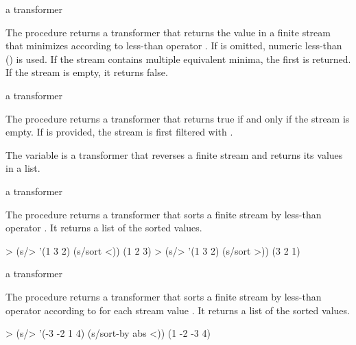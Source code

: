 \begin{procedure}
\end{procedure}
\returns{} a transformer

The  procedure returns a transformer that returns the value  in a
finite stream that minimizes  according to less-than
operator . If  is omitted, numeric less-than (\code{<}) is used. If the
stream contains multiple equivalent minima, the first is returned. If the stream is empty,
it returns false.

\begin{procedure}
\end{procedure}
\returns{} a transformer

The  procedure returns a transformer that returns true if and only if
the stream is empty. If  is provided, the stream is first filtered
with .

\begin{variable}
\end{variable}
\antipar

The  variable is a transformer that reverses a finite stream and returns
its values in a list.

\begin{procedure}
\end{procedure}
\returns{} a transformer


The  procedure returns a transformer that sorts a finite stream by less-than
operator . It returns a list of the sorted values.

\codebegin
> (s/> '(1 3 2) (s/sort <))
(1 2 3)
> (s/> '(1 3 2) (s/sort >))
(3 2 1)
\codeend

\begin{procedure}
\end{procedure}
\returns{} a transformer

The  procedure returns a transformer that sorts a finite stream by
less-than operator  according to  for each stream
value . It returns a list of the sorted values.

\codebegin
> (s/> '(-3 -2 1 4) (s/sort-by abs <))
(1 -2 -3 4)
\codeend

